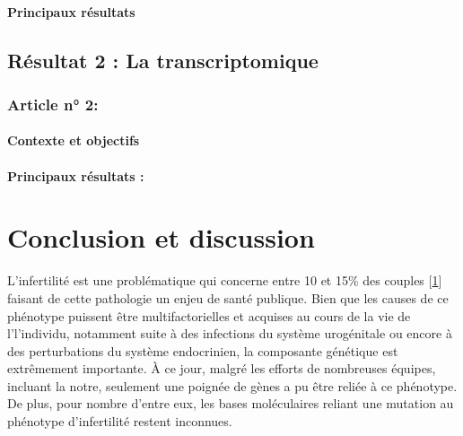 \documentclass[12pt,twoside]{ugathesis}
\begin{document}
\subsubsection{Principaux résultats}\label{principaux-resultats-5}

\section{Résultat 2 : La transcriptomique}\label{transcriptome}

\subsection{Article n° 2:}\label{article-n-2}

\subsubsection{Contexte et objectifs}\label{contexte-et-objectifs-6}

\subsubsection{Principaux résultats :}\label{principaux-resultats-6}

\chapter*{Conclusion et discussion}\label{conclusion-et-discussion}

L'infertilité est une problématique qui concerne entre 10 et 15\% des
couples {[}\protect\hyperlink{ref-Boivin2007a}{1}{]} faisant de cette
pathologie un enjeu de santé publique. Bien que les causes de ce
phénotype puissent être multifactorielles et acquises au cours de la vie
de l'l'individu, notamment suite à des infections du système urogénitale
ou encore à des perturbations du système endocrinien, la composante
génétique est extrêmement importante. À ce jour, malgré les efforts de
nombreuses équipes, incluant la notre, seulement une poignée de gènes a
pu être reliée à ce phénotype. De plus, pour nombre d'entre eux, les
bases moléculaires reliant une mutation au phénotype d'infertilité
restent inconnues.
\end{document}
